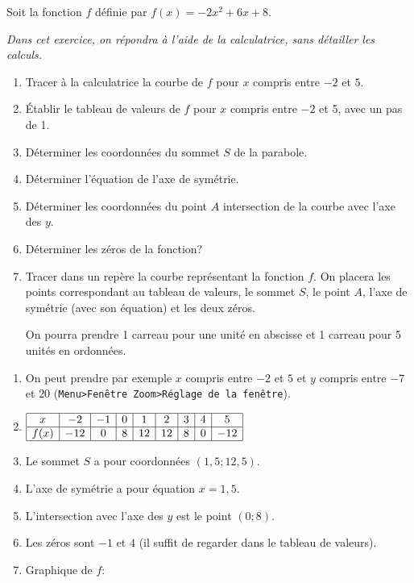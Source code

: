 \begin{exo}[type=solution,title=Avec la calculatrice.]

Soit la fonction $f$ définie par $f(x)=-2x^2+6x+8$. 

{\it Dans cet exercice, on répondra à l'aide de la calculatrice, sans détailler les calculs.}


\begin{enumerate}

\item Tracer à la calculatrice la courbe de $f$ pour $x$ compris entre $-2$ et $5$. 
\item Établir le tableau de valeurs de $f$ pour $x$ compris entre $-2$ et 5, avec un pas de 1.
\item Déterminer  les coordonnées du sommet $S$ de la parabole.
\item Déterminer l'équation de l'axe de symétrie.
\item Déterminer les coordonnées du point $A$ intersection de la courbe avec l'axe des $y$.
\item Déterminer les zéros de la fonction?
\item Tracer dans un repère la courbe représentant la fonction $f$. On placera les points correspondant au tableau de valeurs, le sommet $S$, le point $A$, l'axe de symétrie (avec son équation) et les deux zéros.

On pourra prendre 1 carreau pour une unité en abscisse et 1 carreau pour 5 unités en ordonnées.

\end{enumerate}

\begin{sol}
\begin{enumerate}
\item On peut prendre par exemple $x$ compris entre $-2$ et $5$ et $y$ compris entre $-7$ et $20$ (\texttt{Menu>Fenêtre Zoom>Réglage de la fenêtre}).
\item 
$
\begin{array}{|c|c|c|c|c|c|c|c|c|}\hline 
x & -2 &-1 & 0 & 1 & 2 & 3 & 4 & 5 \\ \hline 
f(x) & -12 & 0 & 8  & 12 & 12 & 8 & 0 & -12 \\  \hline 
\end{array}
$

\item Le sommet $S$ a pour coordonnées $(1,5;12,5)$.
\item L'axe de symétrie a pour équation $x=1,5$.
\item L'intersection avec l'axe des $y$ est le point $(0;8)$.
\item Les zéros sont $-1$ et $4$ (il suffit de regarder dans le tableau de valeurs).
\item Graphique de $f$:


\end{enumerate}
\end{sol}
\end{exo}
